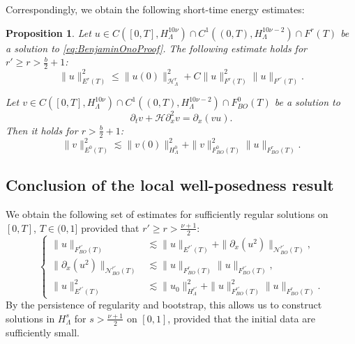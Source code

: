 \documentclass{amsart}
\newtheorem{proposition}[theorem]{Proposition}
\theoremstyle{definition}
\begin{document}
Correspondingly, we obtain the following short-time energy estimates:
\begin{proposition}
Let $u \in C([0,T],H^{10\nu}_\Lambda) \cap C^1((0,T),H^{10 \nu-2}_{\Lambda}) \cap F^r(T) $ be a solution to \eqref{eq:BenjaminOnoProof}. The following estimate holds for $r' \geq r > \frac{b}{2} + 1$:
\begin{equation*}
\| u \|^2_{E^r(T)} \leq \| u(0) \|^2_{\mathcal{H}^r_\Lambda} + C \|u \|^2_{F^r(T)} \| u \|_{F^{r'}(T)}.
\end{equation*}

Let $v \in C([0,T],H^{10\nu}_\Lambda) \cap C^1((0,T),H^{10 \nu-2}_{\Lambda}) \cap F_{BO}^0(T)$ be a solution to
\begin{equation*}
\partial_t v +  \mathcal{H} \partial_x^2 v = \partial_x (v u).
\end{equation*}
Then it holds for $r> \frac{b}{2}+1$:
\begin{equation*}
\| v \|^2_{E^0(T)} \lesssim \| v(0) \|^2_{H^0_{\Lambda}} + \| v \|^2_{F_{BO}^0(T)} \| u \|_{F_{BO}^r(T)}.
\end{equation*}
\end{proposition}

\subsection{Conclusion of the local well-posedness result}

We obtain the following set of estimates for sufficiently regular solutions on $[0,T]$, $T \in (0,1]$ provided that $r' \geq r > \frac{\nu+1}{2}$:
\begin{equation*}
\left\{ \begin{array}{cl}
\| u \|_{F_{BO}^{r'}(T)} &\lesssim \| u \|_{E^{r'}(T)} + \| \partial_x(u^2) \|_{\mathcal{N}_{BO}^{r'}(T)}, \\
\| \partial_x(u^2) \|_{\mathcal{N}_{BO}^{r'}(T)} &\lesssim \| u \|_{F_{BO}^{r}(T)} \| u \|_{F_{BO}^{r'}(T)}, \\
\| u \|^2_{E^{r'}(T)} &\lesssim \| u_0 \|_{H^{r'}_{\Lambda}}^2 + \| u \|_{F_{BO}^{r'}(T)}^2 \| u \|_{F_{BO}^r(T)}.
\end{array} \right.
\end{equation*}
By the persistence of regularity and bootstrap, this allows us to construct solutions in $H^s_{\Lambda}$ for $s>\frac{\nu+1}{2}$ on $[0,1]$, provided that the initial data are sufficiently small.
\end{document}
